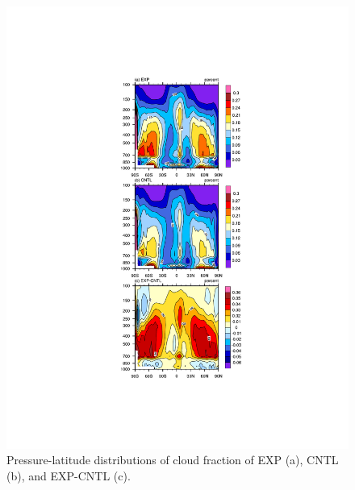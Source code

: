 \documentclass[gmd, manuscript]{copernicus}
\begin{document}
\begin{figure}[t]
\includegraphics[width=15.3cm]{cloud}
\caption{Pressure-latitude distributions of cloud fraction of EXP (a), CNTL (b), and EXP-CNTL (c).}
\end{figure}
\end{document}
